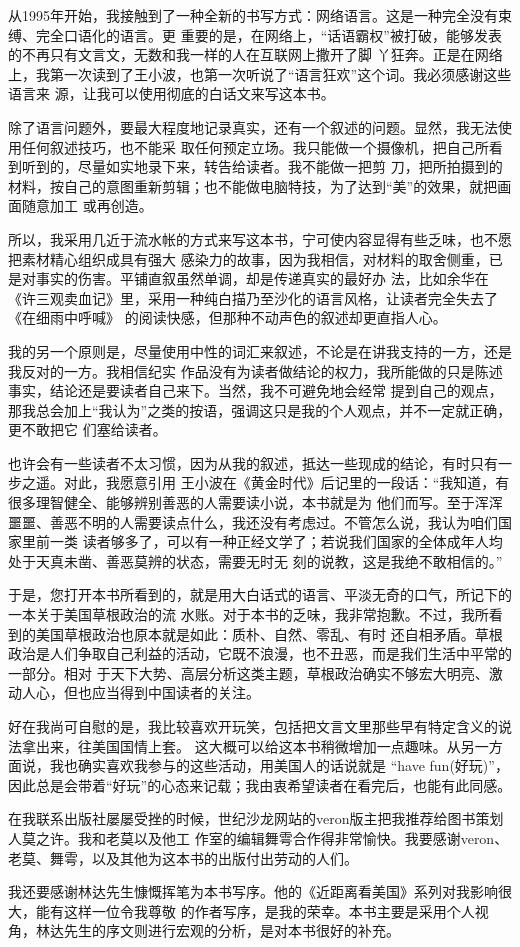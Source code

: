 ﻿\documentclass[11pt]{article}
\begin{document}
从1995年开始，我接触到了一种全新的书写方式：网络语言。这是一种完全没有束缚、完全口语化的语言。更
重要的是，在网络上，``话语霸权''被打破，能够发表的不再只有文言文，无数和我一样的人在互联网上撒开了脚
丫狂奔。正是在网络上，我第一次读到了王小波，也第一次听说了``语言狂欢''这个词。我必须感谢这些语言来
源，让我可以使用彻底的白话文来写这本书。

除了语言问题外，要最大程度地记录真实，还有一个叙述的问题。显然，我无法使用任何叙述技巧，也不能采
取任何预定立场。我只能做一个摄像机，把自己所看到听到的，尽量如实地录下来，转告给读者。我不能做一把剪
刀，把所拍摄到的材料，按自己的意图重新剪辑；也不能做电脑特技，为了达到``美''的效果，就把画面随意加工
或再创造。

所以，我采用几近于流水帐的方式来写这本书，宁可使内容显得有些乏味，也不愿把素材精心组织成具有强大
感染力的故事，因为我相信，对材料的取舍侧重，已是对事实的伤害。平铺直叙虽然单调，却是传递真实的最好办
法，比如余华在《许三观卖血记》里，采用一种纯白描乃至沙化的语言风格，让读者完全失去了《在细雨中呼喊》
的阅读快感，但那种不动声色的叙述却更直指人心。

我的另一个原则是，尽量使用中性的词汇来叙述，不论是在讲我支持的一方，还是我反对的一方。我相信纪实
作品没有为读者做结论的权力，我所能做的只是陈述事实，结论还是要读者自己来下。当然，我不可避免地会经常
提到自己的观点，那我总会加上``我认为''之类的按语，强调这只是我的个人观点，并不一定就正确，更不敢把它
们塞给读者。

也许会有一些读者不太习惯，因为从我的叙述，抵达一些现成的结论，有时只有一步之遥。对此，我愿意引用
王小波在《黄金时代》后记里的一段话：``我知道，有很多理智健全、能够辨别善恶的人需要读小说，本书就是为
他们而写。至于浑浑噩噩、善恶不明的人需要读点什么，我还没有考虑过。不管怎么说，我认为咱们国家里前一类
读者够多了，可以有一种正经文学了；若说我们国家的全体成年人均处于天真未凿、善恶莫辨的状态，需要无时无
刻的说教，这是我绝不敢相信的。''

于是，您打开本书所看到的，就是用大白话式的语言、平淡无奇的口气，所记下的一本关于美国草根政治的流
水账。对于本书的乏味，我非常抱歉。不过，我所看到的美国草根政治也原本就是如此：质朴、自然、零乱、有时
还自相矛盾。草根政治是人们争取自己利益的活动，它既不浪漫，也不丑恶，而是我们生活中平常的一部分。相对
于天下大势、高层分析这类主题，草根政治确实不够宏大明亮、激动人心，但也应当得到中国读者的关注。


好在我尚可自慰的是，我比较喜欢开玩笑，包括把文言文里那些早有特定含义的说法拿出来，往美国国情上套。
这大概可以给这本书稍微增加一点趣味。从另一方面说，我也确实喜欢我参与的这些活动，用美国人的话说就是
``have fun(好玩)''，因此总是会带着``好玩''的心态来记载；我由衷希望读者在看完后，也能有此同感。

在我联系出版社屡屡受挫的时候，世纪沙龙网站的veron版主把我推荐给图书策划人莫之许。我和老莫以及他工
作室的编辑舞雩合作得非常愉快。我要感谢veron、老莫、舞雩，以及其他为这本书的出版付出劳动的人们。

我还要感谢林达先生慷慨挥笔为本书写序。他的《近距离看美国》系列对我影响很大，能有这样一位令我尊敬
的作者写序，是我的荣幸。本书主要是采用个人视角，林达先生的序文则进行宏观的分析，是对本书很好的补充。
\end{document}
